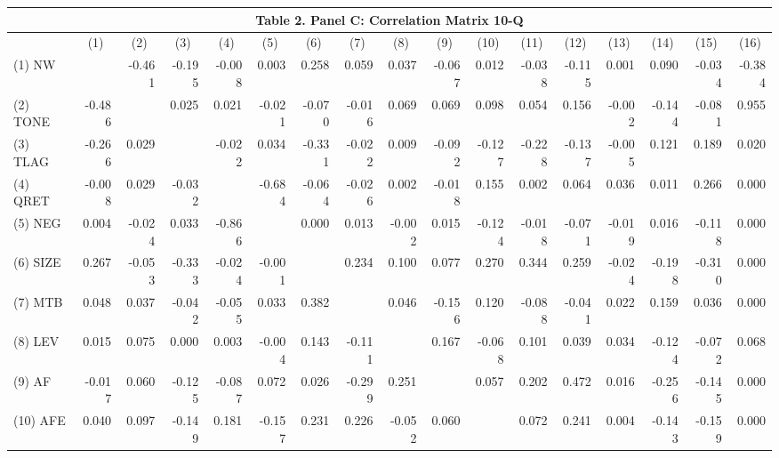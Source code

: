 \begin{table}[htbp] \label{T2PC}
  \centering
    \begin{tabular}{lrrrrrrrrrrrrrrrr}
    \multicolumn{17}{c}{\textbf{Table 2. Panel C: Correlation Matrix 10-Q}} \\
    \midrule
    \midrule
      & \multicolumn{1}{c}{(1)} & \multicolumn{1}{c}{(2)} & \multicolumn{1}{c}{(3)} & \multicolumn{1}{c}{(4)} & \multicolumn{1}{c}{(5)} & \multicolumn{1}{c}{(6)} & \multicolumn{1}{c}{(7)} & \multicolumn{1}{c}{(8)} & \multicolumn{1}{c}{(9)} & \multicolumn{1}{c}{(10)} & \multicolumn{1}{c}{(11)} & \multicolumn{1}{c}{(12)} & \multicolumn{1}{c}{(13)} & \multicolumn{1}{c}{(14)} & \multicolumn{1}{c}{(15)} & \multicolumn{1}{c}{(16)} \\
    \midrule
    (1) NW &  & -0.461 & -0.195 & -0.008 & 0.003 & 0.258 & 0.059 & 0.037 & -0.067 & 0.012 & -0.038 & -0.115 & 0.001 & 0.090 & -0.034 & -0.384 \\
    (2) TONE & -0.486 & & 0.025 & 0.021 & -0.021 & -0.070 & -0.016 & 0.069 & 0.069 & 0.098 & 0.054 & 0.156 & -0.002 & -0.144 & -0.081 & 0.955 \\
    (3) TLAG & -0.266 & 0.029 & & -0.022 & 0.034 & -0.331 & -0.022 & 0.009 & -0.092 & -0.127 & -0.228 & -0.137 & -0.005 & 0.121 & 0.189 & 0.020 \\
    (4) QRET & -0.008 & 0.029 & -0.032 & & -0.684 & -0.064 & -0.026 & 0.002 & -0.018 & 0.155 & 0.002 & 0.064 & 0.036 & 0.011 & 0.266 & 0.000 \\
    (5) NEG & 0.004 & -0.024 & 0.033 & -0.866 & & 0.000 & 0.013 & -0.002 & 0.015 & -0.124 & -0.018 & -0.071 & -0.019 & 0.016 & -0.118 & 0.000 \\
    (6) SIZE & 0.267 & -0.053 & -0.333 & -0.024 & -0.001 &  & 0.234 & 0.100 & 0.077 & 0.270 & 0.344 & 0.259 & -0.024 & -0.198 & -0.310 & 0.000 \\
    (7) MTB & 0.048 & 0.037 & -0.042 & -0.055 & 0.033 & 0.382 & & 0.046 & -0.156 & 0.120 & -0.088 & -0.041 & 0.022 & 0.159 & 0.036 & 0.000 \\
    (8) LEV & 0.015 & 0.075 & 0.000 & 0.003 & -0.004 & 0.143 & -0.111 &  & 0.167 & -0.068 & 0.101 & 0.039 & 0.034 & -0.124 & -0.072 & 0.068 \\
    (9) AF & -0.017 & 0.060 & -0.125 & -0.087 & 0.072 & 0.026 & -0.299 & 0.251 &  & 0.057 & 0.202 & 0.472 & 0.016 & -0.256 & -0.145 & 0.000 \\
    (10) AFE & 0.040 & 0.097 & -0.149 & 0.181 & -0.157 & 0.231 & 0.226 & -0.052 & 0.060 &  & 0.072 & 0.241 & 0.004 & -0.143 & -0.159 & 0.000 \\

\end{tabular}
\end{table}
